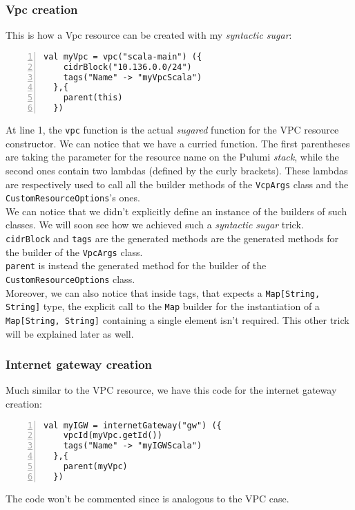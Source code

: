 \subsubsection{Vpc creation}
\label{sssec:vpc-creation-scala}
This is how a Vpc resource can be created with my \textit{syntactic sugar}:\\
\begin{minipage}{\linewidth}
\begin{lstlisting}[numbers=left, numberstyle=\tiny, numbersep=-5pt, stepnumber=1]
  val myVpc = vpc("scala-main") ({
    cidrBlock("10.136.0.0/24")
    tags("Name" -> "myVpcScala")
  },{
    parent(this)
  })
\end{lstlisting}
\end{minipage}
At line 1, the \texttt{vpc} function is the actual \textit{sugared} function for the VPC resource constructor.
We can notice that we have a curried function.
The first parentheses are taking the parameter for the resource name on the Pulumi \textit{stack}, while the second ones contain two lambdas (defined by the curly brackets).
These lambdas are respectively used to call all the builder methods of the \texttt{VcpArgs} class and the \texttt{CustomResourceOptions}'s ones.\\
We can notice that we didn't explicitly define an instance of the builders of such classes.
We will soon see how we achieved such a \textit{syntactic sugar} trick.\\
\texttt{cidrBlock} and \texttt{tags} are the generated methods are the generated methods for the builder of the \texttt{VpcArgs} class.\\ 
\texttt{parent} is instead the generated method for the builder of the \texttt{CustomResourceOptions} class.\\
Moreover, we can also notice that inside tags, that expects a \texttt{Map[String, String]} type, the explicit call to the \texttt{Map} builder for the instantiation of a \texttt{Map[String, String]} containing a single element isn't required.
This other trick will be explained later as well.

\subsubsection{Internet gateway creation}
Much similar to the VPC resource, we have this code for the internet gateway creation:\\
\begin{minipage}{\linewidth}
\begin{lstlisting}[numbers=left, numberstyle=\tiny, numbersep=-5pt, stepnumber=1]
  val myIGW = internetGateway("gw") ({
    vpcId(myVpc.getId())
    tags("Name" -> "myIGWScala")
  },{
    parent(myVpc)
  })
\end{lstlisting}
\end{minipage}
The code won't be commented since is analogous to the VPC case.

